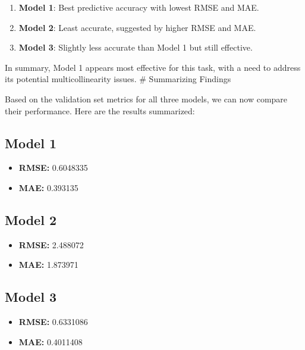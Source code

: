 \documentclass[
]{article}
\providecommand{\tightlist}{%
  \setlength{\itemsep}{0pt}\setlength{\parskip}{0pt}}
\begin{document}
\begin{enumerate}
\def\labelenumi{\arabic{enumi}.}
\item
  \textbf{Model 1}: Best predictive accuracy with lowest RMSE and MAE.
\item
  \textbf{Model 2}: Least accurate, suggested by higher RMSE and MAE.
\item
  \textbf{Model 3}: Slightly less accurate than Model 1 but still
  effective.
\end{enumerate}

In summary, Model 1 appears most effective for this task, with a need to
address its potential multicollinearity issues. \# Summarizing Findings

Based on the validation set metrics for all three models, we can now
compare their performance. Here are the results summarized:

\hypertarget{model-1}{%
\subsection{Model 1}\label{model-1}}

\begin{itemize}
\tightlist
\item
  \textbf{RMSE:} 0.6048335
\item
  \textbf{MAE:} 0.393135
\end{itemize}

\hypertarget{model-2}{%
\subsection{Model 2}\label{model-2}}

\begin{itemize}
\tightlist
\item
  \textbf{RMSE:} 2.488072
\item
  \textbf{MAE:} 1.873971
\end{itemize}

\hypertarget{model-3}{%
\subsection{Model 3}\label{model-3}}

\begin{itemize}
\tightlist
\item
  \textbf{RMSE:} 0.6331086
\item
  \textbf{MAE:} 0.4011408
\end{itemize}
\end{document}
